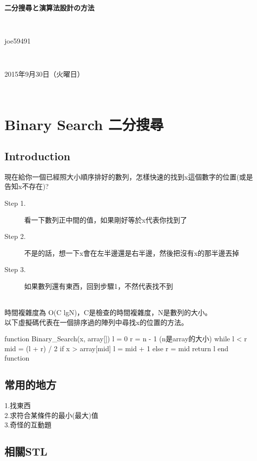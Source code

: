 \documentclass{article}
\title{\hmwkClass}
\author{\hmwkAuthorName}
\date{\hmwkDueDate}
\def\normalsize{\fontsize{12}{16}\selectfont}
\def\large{\fontsize{16}{24}\selectfont}
\def\LARGE{\fontsize{24}{36}\selectfont}
\newcommand{\hmwkDueDate}{2015年9月30日（火曜日）} %
\newcommand{\hmwkClass}{二分搜尋と演算法設計の方法} %
\newcommand{\hmwkAuthorName}{joe59491} %
\begin{document}
\LARGE~\\[4ex]
\centerline{\bf\hmwkClass}\large\\[2ex]\centerline{\hmwkAuthorName}\\[2ex]\centerline{\hmwkDueDate}\\
\normalsize


\section{Binary Search 二分搜尋}
\subsection*{Introduction}
現在給你一個已經照大小順序排好的數列，怎樣快速的找到x這個數字的位置(或是告知x不存在)?
\begin{description}
\item[ Step 1.]看一下數列正中間的值，如果剛好等於x代表你找到了
\item[ Step 2.]不是的話，想一下x會在左半邊還是右半邊，然後把沒有x的那半邊丟掉
\item[ Step 3.]如果數列還有東西，回到步驟1，不然代表找不到
\end{description}

~\\時間複雜度為 O(C lgN)，C是檢查的時間複雜度，N是數列的大小。\\
以下虛擬碼代表在一個排序過的陣列中尋找x的位置的方法。

\begin{algorithm}[caption={Binary Search}, label={alg1}]
function Binary_Search(x, array[])
    l = 0
    r = n - 1 (n是array的大小)
    while l < r
        mid = (l + r) / 2
        if x > array[mid]
            l = mid + 1
        else
            r = mid
    return l
end function
\end{algorithm}


\subsection{常用的地方}
1.找東西\\
2.求符合某條件的最小(最大)值\\
3.奇怪的互動題\\


\subsection{相關STL}
\end{document}
